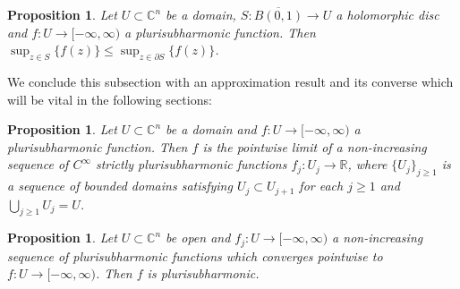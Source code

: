 \documentclass[11pt,a4paper, final, twoside]{article}
\newtheorem{proposition}[theorem]{Proposition}
\numberwithin{equation}{section}
\newcommand{\C}{\mathbb C}
\newcommand{\R}{\mathbb R}
\newcommand{\clos}[1]{\overline{#1}}
\newcommand{\bd}{\partial}
\newcommand{\ball}{B}
\newcommand{\cts}{C}
\begin{document}
\begin{proposition}
\label{pshmax}
Let $U\subset\C^n$ be a domain, $S\colon \clos{\ball(0,1)}\to U$ a holomorphic disc and $f\colon U\to [-\infty,\infty)$ a plurisubharmonic function. Then 
$\sup_{z\in S}\{f(z)\}\leq \sup_{z\in\bd S}\{f(z)\}$.
\end{proposition}
We conclude this subsection with an approximation result and its converse which will be vital in the following sections:
\begin{proposition}
\label{pshapprox}
Let $U\subset\C^n$ be a domain and $f\colon U\to[-\infty,\infty)$ a plurisubharmonic function. Then $f$ is the pointwise limit
of a non-increasing sequence of $\cts^\infty$ strictly plurisubharmonic functions $f_j\colon U_j\to\R$, where $\{U_j\}_{j\geq 1}$ is a sequence
of bounded domains satisfying $U_j\subset U_{j+1}$ for each $j\geq 1$ and
$\bigcup_{j\geq 1}U_j=U$.
\end{proposition}
\begin{proposition}
\label{decpsh}
Let $U\subset\C^n$ be open and $f_j\colon U\to[-\infty,\infty)$ a non-increasing sequence of plurisubharmonic functions which converges
pointwise to $f\colon U\to[-\infty,\infty)$. Then $f$ is plurisubharmonic.
\end{proposition}
\end{document}
